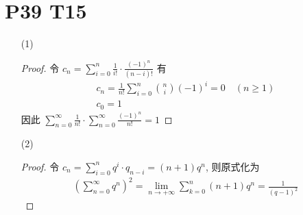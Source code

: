 \documentclass{article}
\newcommand{\nti}{\lim_{n \to +\infty}}
\newcommand{\sifz}{\sum_{n = 0}^{\infty}}
\begin{document}
\section*{P39 T15}

\begin{itemize}
    \item [(1)]
    \begin{proof}
        令 $c_n = \sum_{i = 0}^{n}\frac{1}{i!}\cdot\frac{(-1)^{n}}{(n - i)!}$ 有
        \begin{align*}
            c_n = \frac{1}{n!}\sum_{i = 0}^{n}\binom{n}{i}(-1)^i = 0\quad (n \geqslant 1) \\
            c_0 = 1
        \end{align*}
        因此 $\sifz \frac{1}{n!} \cdot \sifz \frac{(-1)^n}{n!} = 1$
    \end{proof}
    \item [(2)]
    \begin{proof}
        令 $c_n = \sum_{i = 0}^{n}q^i\cdot q_{n - i} = (n + 1)q^n$, 则原式化为
        \begin{align*}
            \left(\sifz q^n\right)^2 = \nti \sum_{k = 0}^{n}(n + 1)q^n = \frac{1}{(q - 1)^2}
        \end{align*}
    \end{proof}
\end{itemize}
\end{document}

